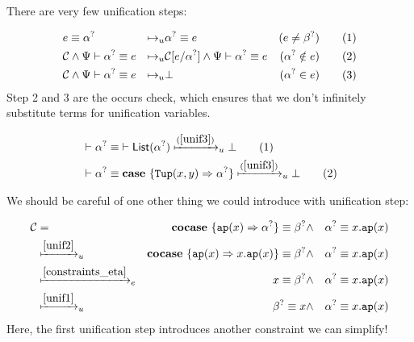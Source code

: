 \documentclass[twoside,12pt,a4paper]{article}
\begin{document}
There are very few unification steps: 
\begin{definition}[Unification]
    \begin{align*}
        & e \equiv\alpha^?
        &\mapsto_u& \alpha^? \equiv e &(e\neq \beta^?)
        \tag{1}\label{unif1}\\
        &\mathcal{C} \wedge \Psi \vdash \alpha^? \equiv e 
        &\mapsto_u& \mathcal{C}[e/\alpha^?] \wedge \Psi \vdash \alpha^? \equiv e &(\alpha^? \notin e)
        \tag{2}\label{unif2}\\
        &\mathcal{C} \wedge \Psi \vdash \alpha^? \equiv e
        &\mapsto_u& \bot &(\alpha^?\in e)
        \tag{3}\label{unif3}
    \end{align*}
Step 2 and 3 are the occurs check, which ensures that we don't infinitely substitute terms for unification variables.
\end{definition}

\begin{example}
    \begin{align*}
        &\vdash\alpha^? \equiv \; \vdash \mathsf{List(}\alpha^?\mathsf{)} \xmapsto{(\ref{unif3})}_u \bot\tag{1}\\
        &\vdash\alpha^? \equiv \textbf{case}\ \{\mathtt{Tup(}x, y\mathtt{)}\Rightarrow \alpha^?\}\xmapsto{(\ref{unif3})}_u \bot\tag{2}
    \end{align*}
\end{example}

We should be careful of one other thing we could introduce with unification step:
\begin{example}
    \begin{align*}
        \mathcal{C} &=& \textbf{cocase}\ \{\texttt{ap}(x)\Rightarrow\alpha^?\}\equiv \beta^?
        &\wedge& \alpha^? \equiv x.\texttt{ap}(x)\\
        &\xmapsto{\ref{unif2}}_u& \textbf{cocase}\ \{\texttt{ap}(x)\Rightarrow x.\texttt{ap}(x)\}\equiv \beta^?
        &\wedge& \alpha^? \equiv x.\texttt{ap}(x)\\
        &\xmapsto{\ref{constraints_eta}}_e& x\equiv \beta^?
        &\wedge& \alpha^? \equiv x.\texttt{ap}(x)\\
        &\xmapsto{\ref{unif1}}_u&\beta^?\equiv x
        &\wedge& \alpha^? \equiv x.\texttt{ap}(x)
    \end{align*}
    Here, the first unification step introduces another constraint we can simplify! 
\end{example}
\end{document}
